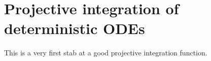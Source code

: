 \section{Projective integration of deterministic ODEs}
\label{sec:ProjInt}

This is a very first stab at a good projective integration function.



